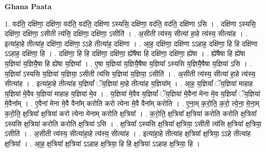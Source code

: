 \documentclass[17pt]{extarticle}
\begin{document}
\textbf{Ghana Paata } \newline

1. वद॑ति॒ दक्षि॑णा॒ दक्षि॑णा॒ वद॑ति॒ वद॑ति॒ दक्षि॑णा ऽस्यसि॒ दक्षि॑णा॒ वद॑ति॒ वद॑ति॒ दक्षि॑णा ऽसि । . दक्षि॑णा ऽस्यसि॒ दक्षि॑णा॒ दक्षि॑णा॒ ऽसीती त्य॑सि॒ दक्षि॑णा॒ दक्षि॑णा॒ ऽसीति॑ । . अ॒सीती त्य॑स्य॒ सीत्या॑ हा॒हे त्य॑स्य॒ सीत्या॑ह । . इत्या॑हा॒हे तीत्या॑ह॒ दक्षि॑णा॒ दक्षि॑णा॒ ऽऽहे तीत्या॑ह॒ दक्षि॑णा । . आ॒ह॒ दक्षि॑णा॒ दक्षि॑णा ऽऽहाह॒ दक्षि॑णा॒ हि हि दक्षि॑णा ऽऽहाह॒ दक्षि॑णा॒ हि । . दक्षि॑णा॒ हि हि दक्षि॑णा॒ दक्षि॑णा॒ ह्ये॑षैषा हि दक्षि॑णा॒ दक्षि॑णा॒ ह्ये॑षा । . ह्ये॑षैषा हि ह्ये॑षा य॒ज्ञिया॑ य॒ज्ञियै॒षा हि ह्ये॑षा य॒ज्ञिया᳚ । . ए॒षा य॒ज्ञिया॑ य॒ज्ञियै॒षैषा य॒ज्ञिया᳚ ऽस्यसि य॒ज्ञियै॒षैषा य॒ज्ञिया॑ ऽसि । . य॒ज्ञिया᳚ ऽस्यसि य॒ज्ञिया॑ य॒ज्ञिया॒ ऽसीती त्य॑सि य॒ज्ञिया॑ य॒ज्ञिया॒ ऽसीति॑ । . अ॒सीती त्य॑स्य॒ सीत्या॑ हा॒हे त्य॑स्य॒ सीत्या॑ह । . इत्या॑हा॒हे तीत्या॑ह य॒ज्ञियां᳚ ॅय॒ज्ञिया॑ मा॒हे तीत्या॑ह य॒ज्ञिया᳚म् । . आ॒ह॒ य॒ज्ञियां᳚ ॅय॒ज्ञिया॑ माहाह य॒ज्ञिया॑ मे॒वैव य॒ज्ञिया॑ माहाह य॒ज्ञिया॑ मे॒व । . य॒ज्ञिया॑ मे॒वैव य॒ज्ञियां᳚ ॅय॒ज्ञिया॑ मे॒वैना॑ मेना मे॒व य॒ज्ञियां᳚ ॅय॒ज्ञिया॑ मे॒वैना᳚म् । . ए॒वैना॑ मेना मे॒वै वैना᳚म् करोति करो त्येना मे॒वै वैना᳚म् करोति । . ए॒ना॒म् क॒रो॒ति॒ क॒रो॒ त्ये॒ना॒ मे॒ना॒म् क॒रो॒ति॒ क्ष॒त्रिया᳚ क्ष॒त्रिया॑ करो त्येना मेनाम् करोति क्ष॒त्रिया᳚ । . क॒रो॒ति॒ क्ष॒त्रिया᳚ क्ष॒त्रिया॑ करोति करोति क्ष॒त्रिया᳚ ऽस्यसि क्ष॒त्रिया॑ करोति करोति क्ष॒त्रिया॑ ऽसि । . क्ष॒त्रिया᳚ ऽस्यसि क्ष॒त्रिया᳚ क्ष॒त्रिया॒ ऽसीती त्य॑सि क्ष॒त्रिया᳚ क्ष॒त्रिया॒ ऽसीति॑ । . अ॒सीती त्य॑स्य॒ सीत्या॑हा॒हे त्य॑स्य॒ सीत्या॑ह । . इत्या॑हा॒हे तीत्या॑ह क्ष॒त्रिया᳚ क्ष॒त्रिया॒ ऽऽहे तीत्या॑ह क्ष॒त्रिया᳚ । . आ॒ह॒ क्ष॒त्रिया᳚ क्ष॒त्रिया॑ ऽऽहाह क्ष॒त्रिया॒ हि हि क्ष॒त्रिया॑ ऽऽहाह क्ष॒त्रिया॒ हि । \newline
\end{document}
